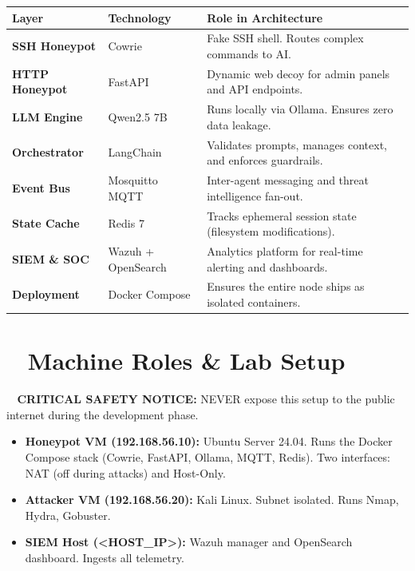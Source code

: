 \documentclass[11pt,a4paper]{article}
\begin{document}
\renewcommand{\arraystretch}{1.5}
\begin{tabularx}{\textwidth}{@{} l l X @{}}
\toprule
\textbf{Layer} & \textbf{Technology} & \textbf{Role in Architecture} \\
\midrule
\textbf{SSH Honeypot} & Cowrie & Fake SSH shell. Routes complex commands to AI. \\
\textbf{HTTP Honeypot} & FastAPI & Dynamic web decoy for admin panels and API endpoints. \\
\textbf{LLM Engine} & Qwen2.5 7B & Runs locally via Ollama. Ensures zero data leakage. \\
\textbf{Orchestrator} & LangChain & Validates prompts, manages context, and enforces guardrails. \\
\textbf{Event Bus} & Mosquitto MQTT & Inter-agent messaging and threat intelligence fan-out. \\
\textbf{State Cache} & Redis 7 & Tracks ephemeral session state (filesystem modifications). \\
\textbf{SIEM \& SOC} & Wazuh + OpenSearch & Analytics platform for real-time alerting and dashboards. \\
\textbf{Deployment} & Docker Compose & Ensures the entire node ships as isolated containers. \\
\bottomrule
\end{tabularx}

\section*{\faServer~ Machine Roles \& Lab Setup}
\begin{tcolorbox}[colback=accent!10!white, coltext=accent!80!black]
    \textbf{\faExclamationTriangle~ CRITICAL SAFETY NOTICE:} NEVER expose this setup to the public internet during the development phase.
\end{tcolorbox}

\begin{itemize}[leftmargin=*, label=\faDesktop]
    \item \textbf{Honeypot VM (192.168.56.10):} Ubuntu Server 24.04. Runs the Docker Compose stack (Cowrie, FastAPI, Ollama, MQTT, Redis). Two interfaces: NAT (off during attacks) and Host-Only.
    \item \textbf{Attacker VM (192.168.56.20):} Kali Linux. Subnet isolated. Runs Nmap, Hydra, Gobuster.
    \item \textbf{SIEM Host (<HOST\_IP>):} Wazuh manager and OpenSearch dashboard. Ingests all telemetry.
\end{itemize}
\end{document}

